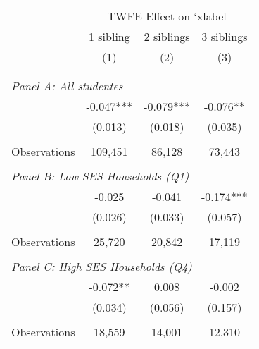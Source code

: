 \makeatletter
{}
{
\makeatother
\begin{tabular}{lccc}
\toprule
\cmidrule(lr){2-4}
& \multicolumn{3}{c}{TWFE Effect on `xlabel} \\
\cmidrule(lr){2-4}
& 1 sibling & 2 siblings & 3 siblings  \\
\cmidrule(lr){2-2} \cmidrule(lr){3-3} \cmidrule(lr){4-4}
& (1) & (2) & (3)\\
\bottomrule
&  &  &  \\
&  &  &   \\
\multicolumn{4}{l}{\textit{Panel A: All studentes}} \\
\hspace{3mm}        &      -0.047***&      -0.079***&      -0.076** \\
                    &     (0.013)   &     (0.018)   &     (0.035)   \\
                    &               &               &               \\
\hspace{3mm}Observations&     109,451   &      86,128   &      73,443   \\
 
&  &  &   \\
\multicolumn{4}{l}{\textit{Panel B: Low SES Households (Q1)}} \\
\hspace{3mm}        &      -0.025   &      -0.041   &      -0.174***\\
                    &     (0.026)   &     (0.033)   &     (0.057)   \\
                    &               &               &               \\
\hspace{3mm}Observations&      25,720   &      20,842   &      17,119   \\
 
&  &  &   \\
\multicolumn{4}{l}{\textit{Panel C: High SES Households (Q4)}} \\
\hspace{3mm}        &      -0.072** &       0.008   &      -0.002   \\
                    &     (0.034)   &     (0.056)   &     (0.157)   \\
                    &               &               &               \\
\hspace{3mm}Observations&      18,559   &      14,001   &      12,310   \\
 

\end{tabular}}
